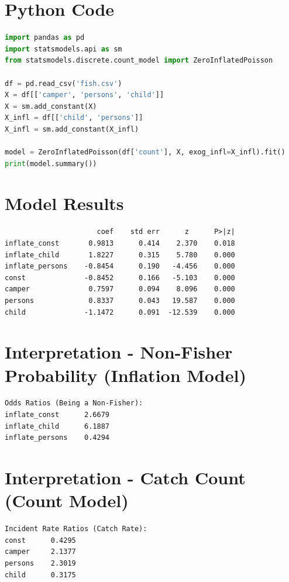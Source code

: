 \documentclass[12pt, a4paper]{article}
\begin{document}
\section*{Python Code}
\begin{lstlisting}[language=Python]
import pandas as pd
import statsmodels.api as sm
from statsmodels.discrete.count_model import ZeroInflatedPoisson

df = pd.read_csv('fish.csv')
X = df[['camper', 'persons', 'child']]
X = sm.add_constant(X)
X_infl = df[['child', 'persons']]
X_infl = sm.add_constant(X_infl)

model = ZeroInflatedPoisson(df['count'], X, exog_infl=X_infl).fit()
print(model.summary())
\end{lstlisting}

\section*{Model Results}
\begin{outputbox}
\begin{verbatim}
                      coef    std err      z      P>|z|
inflate_const       0.9813      0.414    2.370    0.018
inflate_child       1.8227      0.315    5.780    0.000
inflate_persons    -0.8454      0.190   -4.456    0.000
const              -0.8452      0.166   -5.103    0.000
camper              0.7597      0.094    8.096    0.000
persons             0.8337      0.043   19.587    0.000
child              -1.1472      0.091  -12.539    0.000
\end{verbatim}
\end{outputbox}

\section*{Interpretation - Non-Fisher Probability (Inflation Model)}
\begin{outputbox}
\begin{verbatim}
Odds Ratios (Being a Non-Fisher):
inflate_const      2.6679
inflate_child      6.1887
inflate_persons    0.4294
\end{verbatim}
\end{outputbox}

\section*{Interpretation - Catch Count (Count Model)}
\begin{outputbox}
\begin{verbatim}
Incident Rate Ratios (Catch Rate):
const      0.4295
camper     2.1377
persons    2.3019
child      0.3175
\end{verbatim}
\end{outputbox}
\end{document}
